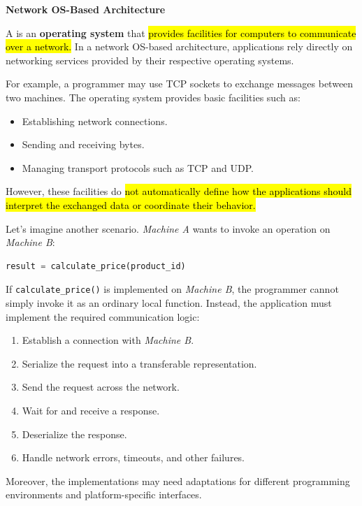 \highspace
\begin{flushleft}
    \textcolor{Green3}{ \textbf{Network OS-Based Architecture}}
\end{flushleft}
A  is an \textbf{operating system} that \hl{provides facilities for computers to communicate over a network.} In a network OS-based architecture, applications rely directly on networking services provided by their respective operating systems.

\highspace
For example, a programmer may use TCP sockets to exchange messages between two machines. The operating system provides basic facilities such as:
\begin{itemize}
    \item Establishing network connections.
    \item Sending and receiving bytes.
    \item Managing transport protocols such as TCP and UDP.
\end{itemize}
\textcolor{Red2}{} However, these facilities do \hl{not automatically define how the applications should interpret the exchanged data or coordinate their behavior.}

\highspace
Let's imagine another scenario. \emph{Machine A} wants to invoke an operation on \emph{Machine B}:
\begin{lstlisting}[language=python]
result = calculate_price(product_id)
\end{lstlisting}
If \texttt{calculate\_price()} is implemented on \emph{Machine B}, the programmer cannot simply invoke it as an ordinary local function. Instead, the application must implement the required communication logic:
\begin{enumerate}
    \item Establish a connection with \emph{Machine B}.
    \item Serialize the request into a transferable representation.
    \item Send the request across the network.
    \item Wait for and receive a response.
    \item Deserialize the response.
    \item Handle network errors, timeouts, and other failures.
\end{enumerate}
Moreover, the implementations may need adaptations for different programming environments and platform-specific interfaces.

